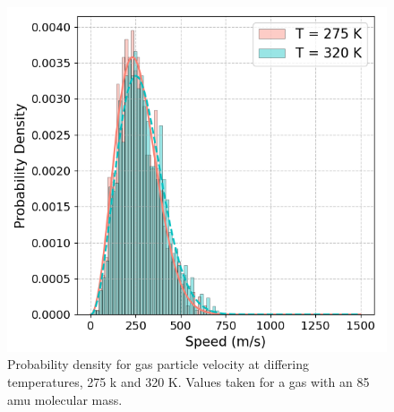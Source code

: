 \documentclass[%
 reprint,
 amsmath,amssymb,
 aps,
]{revtex4-2}
\begin{document}
\begin{figure}[h]
	\caption{Probability density for gas particle velocity at differing temperatures, 275 k and 320 K. Values taken for a gas with an 85 amu molecular mass. }	
	\centering
	\includegraphics[scale=0.5]{appendix2.png}
\end{figure}

\nocite{*}

\end{document}
